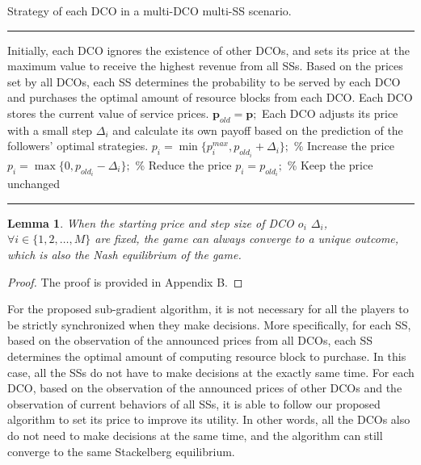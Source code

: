 \documentclass[twocolumn,10pt]{IEEEtran}
\newtheorem{lemma}{Lemma}
\newtheorem{proof}{Proof}
\begin{document}
\begin{algorithm}[htb]
\caption{Strategy of each DCO in a multi-DCO multi-SS scenario.}
\vspace{.1cm}
\hrule
\begin{algorithmic}[1]
\vspace{.2cm}
        \STATE Initially, each DCO ignores the existence of other DCOs, and sets its price at the maximum value to receive the highest revenue from all SSs.
            \STATE Based on the prices set by all DCOs, each SS determines the probability to be served by each DCO and purchases the optimal amount of resource blocks from each DCO.
        \ENDFOR
            \STATE Each DCO stores the current value of service prices. $\mathbf{p}_{old}=\mathbf{p};$
            \STATE Each DCO adjusts its price with a small step $\Delta_i$ and calculate its own payoff based on the prediction of the followers' optimal strategies.
                \STATE  $p_i=\min\{ p^{max}_i, p_{old_i}+\Delta_i\};$    \% Increase the price
            \ELSE
                    \STATE  $p_i=\max \{ 0, p_{old_i}-\Delta_i\};$      \% Reduce the price
                \ELSE
                    \STATE  $p_i=p_{old_i};$  \% Keep the price unchanged
                \ENDIF
            \ENDIF
         \ENDFOR
         \ENDWHILE
\end{algorithmic}\label{algorithm1}
\hrule
\end{algorithm}



\begin{lemma} \label{lemma2}
When the starting price and step size of DCO $o_i$ $\Delta_i$, $\forall i \in \{1,2,\ldots,M\}$ are fixed, the game can always converge to a unique outcome, which is also the Nash equilibrium of the game.
\end{lemma}
\begin{proof}
The proof is provided in Appendix B. \end{proof}


\vspace{0.5 cm}

For the proposed sub-gradient algorithm, it is not necessary for all the players to be strictly synchronized when they make decisions. More specifically, for each SS, based on the observation of the announced prices from all DCOs, each SS determines the optimal amount of computing resource block to purchase. In this case, all the SSs do not have to make decisions at the exactly same time. For each DCO, based on the observation of the announced prices of other DCOs and the observation of current behaviors of all SSs, it is able to follow our proposed algorithm to set its price to improve its utility. In other words, all the DCOs also do not need to make decisions at the same time, and the algorithm can still converge to the same Stackelberg equilibrium.
\end{document}

